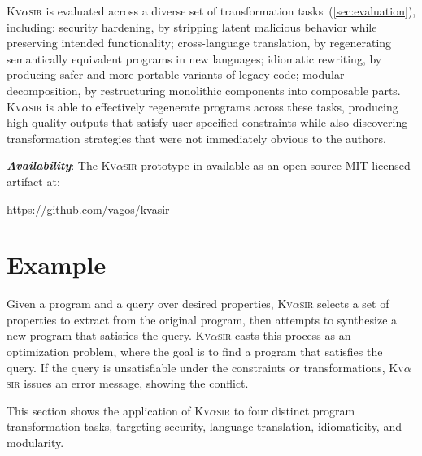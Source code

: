 \documentclass[nonacm,sigplan,review]{acmart}
\newcommand{\sys}{{\scshape Kv{$\alpha$}sir}\xspace}
\newcommand{\heading}[1]{\vspace{2pt}\noindent\textbf{\emph{#1}}:\enspace}
\begin{document}
\sys is evaluated across a diverse set of transformation tasks~(\cref{sec:evaluation}), including:
	security hardening, by stripping latent malicious behavior while preserving intended functionality;
	cross-language translation, by regenerating semantically equivalent programs in new languages;
	idiomatic rewriting, by producing safer and more portable variants of legacy code;
	modular decomposition, by restructuring monolithic components into composable parts.
\sys is able to effectively regenerate programs across these tasks, producing high-quality outputs that satisfy user-specified constraints while also discovering transformation strategies that were not immediately obvious to the authors.

\heading{Availability}
The \sys prototype in available as an open-source MIT-licensed artifact at:
\begin{center}
  \url{https://github.com/vagos/kvasir}
\end{center}

\section{Example}
\label{sec:example}

Given a program and a query over desired properties,
\sys selects a set
of properties to extract from the original program, then attempts to synthesize
a new program that satisfies the query.
\sys casts this process as an optimization problem, where the goal is to find a
program that satisfies the query.
If the query is unsatisfiable under
the constraints or transformations, \sys issues an error
message, showing the conflict.

This section shows the application of \sys
to four distinct program transformation tasks, 
targeting security,
language translation,
idiomaticity,
and modularity.
\end{document}
